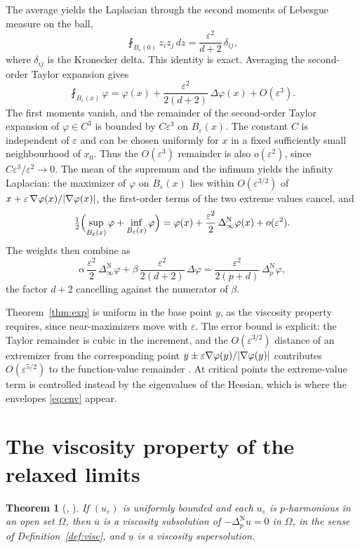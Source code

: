 \documentclass[11pt,reqno]{amsart}
\newcommand{\eps}{\varepsilon}
\newcommand{\pnlap}{\Delta_p^{\mathrm{N}}}       %
\newcommand{\inflap}{\Delta_\infty^{\mathrm{N}}} %
\DeclarePairedDelimiter{\abs}{\lvert}{\rvert}
\theoremstyle{plain}
\newtheorem{theorem}{Theorem}[section]
\theoremstyle{definition}
\theoremstyle{remark}
\begin{document}
The average yields the Laplacian through the second moments of Lebesgue
measure on the ball,
\[
  \fint_{B_\eps(0)} z_i z_j \, dz = \frac{\eps^2}{d+2}\,\delta_{ij},
\]
where $\delta_{ij}$ is the Kronecker delta. This identity is exact.
Averaging the second-order Taylor expansion gives
\[
  \fint_{B_\eps(x)} \varphi = \varphi(x) + \frac{\eps^2}{2(d+2)}\,
  \Delta\varphi(x) + O(\eps^3).
\]
The first moments vanish, and the remainder of the second-order Taylor
expansion of $\varphi \in C^3$ is bounded by $C\eps^3$ on $B_\eps(x)$.
The constant $C$ is independent of $\eps$ and can be chosen uniformly for
$x$ in a fixed sufficiently small neighbourhood of $x_0$. Thus the
$O(\eps^3)$ remainder is also $o(\eps^2)$, since $C\eps^3/\eps^2\to0$.
The mean of the supremum and the infimum yields the infinity
Laplacian: the maximizer of $\varphi$ on $\overline B_\eps(x)$ lies within
$O(\eps^{3/2})$ of $x + \eps\,\nabla\varphi(x)/\abs{\nabla\varphi(x)}$, the
first-order terms of the two extreme values cancel, and
\[
  \tfrac12\Bigl(\sup_{B_\eps(x)}\varphi + \inf_{B_\eps(x)}\varphi\Bigr)
  = \varphi(x) + \frac{\eps^2}{2}\,\inflap\varphi(x) + o(\eps^2).
\]
The weights then combine as
\[
  \alpha\,\frac{\eps^2}{2}\,\inflap\varphi
  + \beta\,\frac{\eps^2}{2(d+2)}\,\Delta\varphi
  = \frac{\eps^2}{2(p+d)}\,\pnlap\varphi,
\]
the factor $d+2$ cancelling against the numerator of $\beta$.

Theorem~\ref{thm:exp} is uniform in the base point $y$, as the viscosity
property requires, since near-maximizers move with $\eps$. The error bound is
explicit: the Taylor remainder is cubic in the increment, and the
$O(\eps^{3/2})$ distance of an extremizer from the corresponding point
$y\pm\eps\nabla\varphi(y)/\abs{\nabla\varphi(y)}$ contributes
$O(\eps^{5/2})$ to the function-value remainder \cite[\S5]{MMcomp}.
At critical points the
extreme-value term is controlled instead by the eigenvalues of the Hessian,
which is where the envelopes \eqref{eq:env} appear.

\section{The viscosity property of the relaxed limits}\label{sec:relaxed}

\begin{theorem}[, ]\label{thm:A}
If $(u_\eps)$ is uniformly bounded and each $u_\eps$ is $p$-harmonious in an
open set $\Omega$, then $\overline u$ is a viscosity subsolution of
$-\pnlap u = 0$ in $\Omega$, in the sense of Definition~\ref{def:visc}, and
$\underline u$ is a viscosity supersolution.
\end{theorem}
\end{document}
